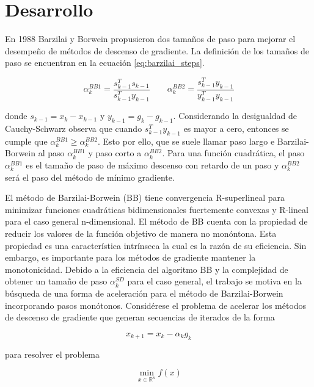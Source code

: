
\section*{Desarrollo}

En 1988 Barzilai y Borwein propusieron dos tamaños de paso para mejorar el desempeño de métodos de descenso de gradiente. La definición de los tamaños de paso se encuentran en la ecuación \ref{eq:barzilai_steps}.

\begin{equation}
	\alpha^{BB1}_k = \frac{s^T_{k-1}s_{k-1}}{s^T_{k-1}y_{k-1}} \qquad \alpha_k^{BB2} = \frac{s_{k-1}^Ty_{k-1}}{y_{k-1}^Ty_{k-1}} \label{eq:barzilai_steps}
\end{equation}

donde $s_{k-1} = x_k - x_{k-1}$ y $y_{k-1} = g_k - g_{k-1}$. Considerando la desigualdad de Cauchy-Schwarz observa que cuando $s_{k-1}^Ty_{k-1}$ es mayor a cero, entonces se cumple que $\alpha_k^{BB1} \geq \alpha_k^{BB2}$. Esto por ello, que se suele llamar paso largo e Barzilai-Borwein al paso $\alpha_k^{BB1}$ y paso corto a $\alpha_k^{BB2}$. Para una función cuadrática, el paso $\alpha_k^{BB1}$ es el tamaño de paso de máximo descenso con retardo de un paso y $\alpha_k^{BB2}$ será el paso del método de mínimo gradiente.

El método de Barzilai-Borwein (BB) tiene convergencia R-superlineal para minimizar funciones cuadráticas bidimensionales fuertemente convexas y R-lineal para el caso general n-dimensional\cite{Fletcher_2005}. El método de BB cuenta con la propiedad de reducir los valores de la función objetivo de manera no monóntona. Esta propiedad es una característica intrínseca la cual es la razón de su eficiencia. Sin embargo, es importante para los métodos de gradiente mantener la monotonicidad. Debido a la eficiencia del algoritmo BB y la complejidad de obtener un tamaño de paso $\alpha_k^{SD}$ para el caso general, el trabajo se motiva en la búsqueda de una forma de aceleración para el método de Barzilai-Borwein incorporando pasos monótonos. Considérese el problema de acelerar los métodos de descenso de gradiente que generan secuencias de iterados de la forma

\begin{equation*}
	x_{k+1} = x_k - \alpha_k g_k
\end{equation*}

para resolver el problema

\begin{equation}
	\min_{x\in\mathbb{R}^n}f(x)
\end{equation}

